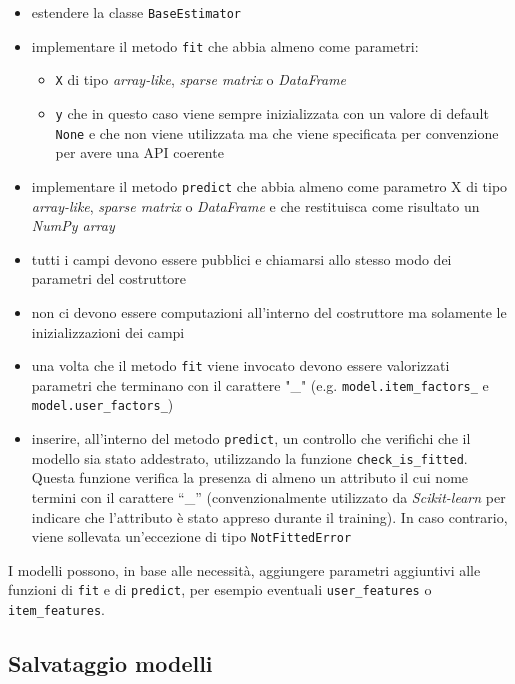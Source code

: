 \begin{itemize}
    \item estendere la classe \texttt{BaseEstimator}
    \item implementare il metodo \texttt{fit} che abbia almeno come parametri:
    \begin{itemize}
        \item \texttt{X} di tipo \textit{array-like}, \textit{sparse matrix} o \textit{DataFrame}
        \item \texttt{y} che in questo caso viene sempre inizializzata con un valore di default \texttt{None} e che non viene utilizzata ma che viene specificata per convenzione per avere una API coerente
    \end{itemize}
    \item implementare il metodo \texttt{predict} che abbia almeno come parametro X di tipo \textit{array-like}, \textit{sparse matrix} o \textit{DataFrame} e che restituisca come risultato un \textit{NumPy array}
    \item tutti i campi devono essere pubblici e chiamarsi allo stesso modo dei parametri del costruttore
    \item non ci devono essere computazioni all'interno del costruttore ma solamente le inizializzazioni dei campi
    \item una volta che il metodo \texttt{fit} viene invocato devono essere valorizzati parametri che terminano con il carattere "\_" (e.g. \texttt{model.item\_factors\_} e \\ \texttt{model.user\_factors\_})
    \item inserire, all'interno del metodo \texttt{predict}, un controllo che verifichi che il modello sia stato addestrato, utilizzando la funzione \texttt{check\_is\_fitted}. Questa funzione verifica la presenza di almeno un attributo il cui nome termini con il carattere ``\_'' (convenzionalmente utilizzato da \textit{Scikit-learn} per indicare che l'attributo è stato appreso durante il training). In caso contrario, viene sollevata un'eccezione di tipo \texttt{NotFittedError}
\end{itemize}

I modelli possono, in base alle necessità, aggiungere parametri aggiuntivi alle funzioni di \texttt{fit} e di \texttt{predict}, per esempio eventuali \texttt{user\_features} o \\ \texttt{item\_features}.

\subsection{Salvataggio modelli}

